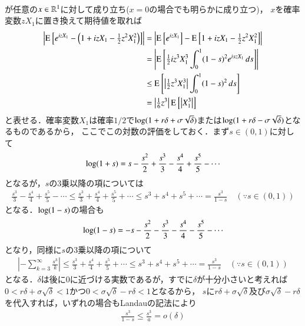 \begin{description}
\begin{align}
		\end{align}
		が任意の$x \in \mathbb{R}^1$に対して成り立ち($x=0$の場合でも明らかに成り立つ)，
		$x$を確率変数$zX_1$に置き換えて期待値を取れば
		\begin{align}
			\left| \operatorname{E}_{}^{} \left[ e^{izX_1} - \left( 1 + izX_1 - \tfrac{1}{2}z^2X_1^2 \right) \right] \right|
			&= \left| \operatorname{E}_{}^{} \left[ e^{izX_1} \right] - \operatorname{E}_{}^{} \left[ 1 + izX_1 - \tfrac{1}{2}z^2X_1^2 \right] \right| \\
			&= \left| \operatorname{E}_{}^{} \left[ \tfrac{1}{2}iz^3X_1^3 \int_{0}^{1} (1-s)^2e^{iszX_1}\, ds \right] \right| \\
			&\leq \operatorname{E}_{}^{} \left[ \left| \tfrac{1}{2}z^3X_1^3 \right| \int_{0}^{1} (1-s)^2\, ds \right] \\
			&= \left|\tfrac{1}{6}z^3 \right| \operatorname{E}_{}^{} \left[ \left| X_1^3 \right| \right] \label{eq:finance_Q2_1}
		\end{align}
		と表せる．確率変数$X_1$は確率$1/2$で$\operatorname{log} (1 + r \delta + \sigma \sqrt{\delta})$または$\operatorname{log} (1 + r \delta - \sigma \sqrt{\delta})$となるものであるから，
		ここでこの対数の評価をしておく．まず$s \in (0,1)$に対して
		\begin{align}
			\operatorname{log} (1 + s) = s - \frac{s^2}{2} + \frac{s^3}{3} - \frac{s^4}{4} + \frac{s^5}{5} - \cdots
		\end{align}
		となるが，$s$の3乗以降の項については
		\begin{align}
			\frac{s^3}{3} - \frac{s^4}{4} + \frac{s^5}{5} - \cdots \leq \frac{s^3}{3} + \frac{s^4}{4} + \frac{s^5}{5} + \cdots
			\leq s^3 + s^4 + s^5 + \cdots
			= \frac{s^3}{1-s} \quad (\because s \in (0,1))
		\end{align}
		となる．$\operatorname{log} (1 - s)$の場合も
		\begin{align}
			\operatorname{log} (1 - s) = -s - \frac{s^2}{2} - \frac{s^3}{3} - \frac{s^4}{4} - \frac{s^5}{5} - \cdots
		\end{align}
		となり，同様に$s$の3乗以降の項について
		\begin{align}
			\left| - \sum_{k=3}^{\infty} \frac{s^k}{k} \right| \leq \frac{s^3}{3} + \frac{s^4}{4} + \frac{s^5}{5} + \cdots
			\leq s^3 + s^4 + s^5 + \cdots
			= \frac{s^3}{1-s} \quad (\because s \in (0,1))
		\end{align}
		となる．$\delta$は後に0に近づける実数であるが，すでに$\delta$が十分小さいと考えれば$0 < r \delta + \sigma \sqrt{\delta} < 1$かつ$0 < \sigma \sqrt{\delta} - r \delta < 1$となるから，
		$s$に$r \delta + \sigma \sqrt{\delta}$及び$\sigma \sqrt{\delta} - r \delta$を代入すれば，いずれの場合もLandauの記法により
		\begin{align}
			\frac{s^3}{1-s} \leq \frac{s^3}{a} = o(\delta) 

\end{align}
\end{description}
